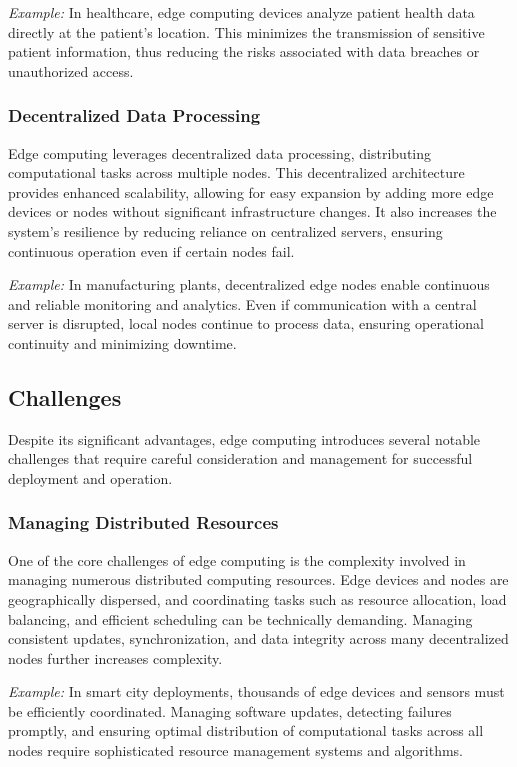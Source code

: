 \documentclass[runningheads]{llncs}
\begin{document}
\noindent\textit{Example:} In healthcare, edge computing devices analyze patient health data directly at the patient's location. This minimizes the transmission of sensitive patient information, thus reducing the risks associated with data breaches or unauthorized access.

\subsubsection{Decentralized Data Processing}
Edge computing leverages decentralized data processing, distributing computational tasks across multiple nodes. This decentralized architecture provides enhanced scalability, allowing for easy expansion by adding more edge devices or nodes without significant infrastructure changes. It also increases the system’s resilience by reducing reliance on centralized servers, ensuring continuous operation even if certain nodes fail.

\noindent\textit{Example:} In manufacturing plants, decentralized edge nodes enable continuous and reliable monitoring and analytics. Even if communication with a central server is disrupted, local nodes continue to process data, ensuring operational continuity and minimizing downtime.


\subsection{Challenges}

Despite its significant advantages, edge computing introduces several notable challenges that require careful consideration and management for successful deployment and operation.

\subsubsection{Managing Distributed Resources}
One of the core challenges of edge computing is the complexity involved in managing numerous distributed computing resources. Edge devices and nodes are geographically dispersed, and coordinating tasks such as resource allocation, load balancing, and efficient scheduling can be technically demanding. Managing consistent updates, synchronization, and data integrity across many decentralized nodes further increases complexity.

\noindent\textit{Example:} In smart city deployments, thousands of edge devices and sensors must be efficiently coordinated. Managing software updates, detecting failures promptly, and ensuring optimal distribution of computational tasks across all nodes require sophisticated resource management systems and algorithms.
\end{document}
